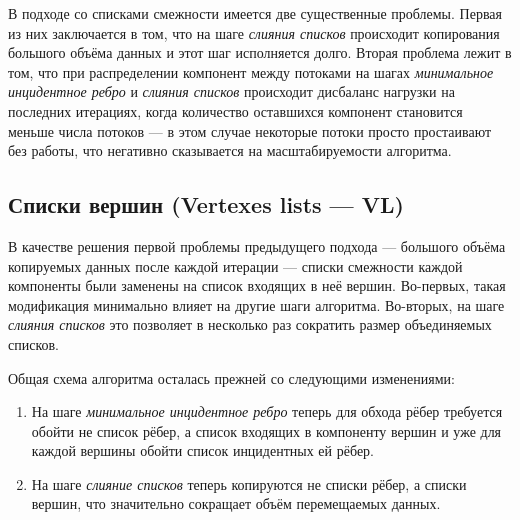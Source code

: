 \documentclass[a4paper,10pt]{extarticle}
\begin{document}
В  подходе со списками смежности имеется две существенные проблемы. 
Первая из них заключается в том, что на шаге \textit{слияния списков} происходит копирования большого объёма данных и этот шаг исполняется долго.
Вторая проблема лежит в том, что при распределении компонент между потоками на шагах \textit{минимальное инцидентное ребро} и \textit{слияния списков} происходит дисбаланс нагрузки на последних итерациях, когда количество оставшихся компонент становится меньше числа потоков --- в этом случае некоторые потоки просто простаивают без работы, что негативно сказывается на масштабируемости алгоритма.


\subsection{Списки вершин (Vertexes lists --- VL)}


В качестве решения первой проблемы предыдущего подхода --- большого объёма копируемых данных после каждой итерации --- списки смежности каждой компоненты были заменены на список входящих в неё вершин. Во-первых, такая модификация минимально влияет на другие шаги алгоритма. Во-вторых, на шаге \textit{слияния списков} это позволяет в несколько раз сократить размер объединяемых списков.

Общая схема алгоритма осталась прежней со следующими изменениями:
\begin{enumerate}
    \item На шаге \textit{минимальное инцидентное ребро} теперь для обхода рёбер требуется обойти не список рёбер, а список входящих в компоненту вершин и уже для каждой вершины обойти список инцидентных ей рёбер.
    \item На шаге \textit{слияние списков} теперь копируются не списки рёбер, а списки вершин, что значительно сокращает объём перемещаемых данных.
\end{enumerate}
\end{document}

